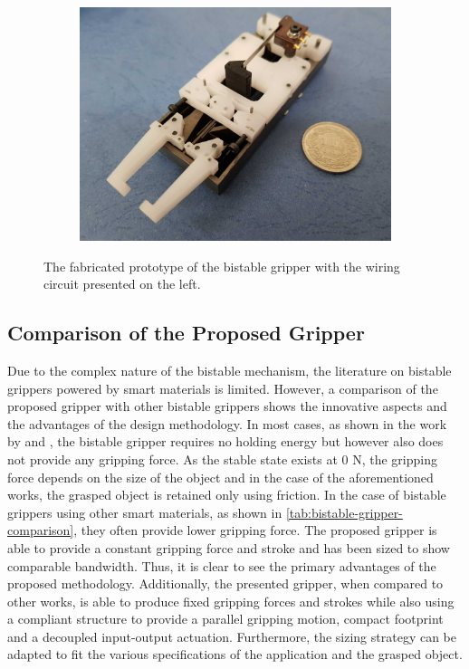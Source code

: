 \begin{figure}[hbt!]
  \begin{subfigure}[b]{0.72\textwidth}
      \includegraphics[width=\textwidth]{images/chap7/smabb-proto-iso.jpg}
  \end{subfigure}
  \caption{The fabricated prototype of the bistable gripper with the wiring circuit presented on the left.}
  \label{fig:final-prototype}
\end{figure}

\subsection{Comparison of the Proposed Gripper}
Due to the complex nature of the bistable mechanism, the literature on bistable grippers powered by smart materials is limited. However, a comparison of the proposed gripper with other bistable grippers shows the innovative aspects and the advantages of the design methodology. In most cases, as shown in the work by \cite{zhangCompliantBistableGrippers2020} and \cite{scholtesDevelopmentBistableSMA2021}, the bistable gripper requires no holding energy but however also does not provide any gripping force. As the stable state exists at 0 N, the gripping force depends on the size of the object and in the case of the aforementioned works, the grasped object is retained only using friction. In the case of bistable grippers using other smart materials, as shown in \cref{tab:bistable-gripper-comparison}, they often provide lower gripping force. The proposed gripper is able to provide a constant gripping force and stroke and has been sized to show comparable bandwidth. Thus, it is clear to see the primary advantages of the proposed methodology. Additionally, the presented gripper, when compared to other works, is able to produce fixed gripping forces and strokes while also using a compliant structure to provide a parallel gripping motion, compact footprint and a decoupled input-output actuation. Furthermore, the sizing strategy can be adapted to fit the various specifications of the application and the grasped object.

